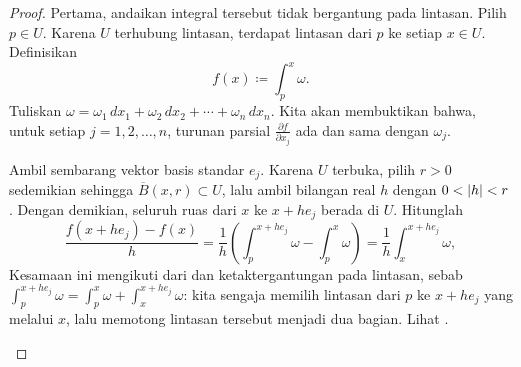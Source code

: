 \begin{proof}
Pertama, andaikan integral tersebut tidak bergantung pada lintasan. Pilih
$p \in U$. Karena $U$ terhubung lintasan, terdapat lintasan dari $p$ ke setiap
$x \in U$. Definisikan
\begin{equation*}
f(x) \coloneqq \int_{p}^x \omega .
\end{equation*}
Tuliskan $\omega = \omega_1 \,dx_1 + \omega_2 \,dx_2 + \cdots + \omega_n \,dx_n$.
Kita akan membuktikan bahwa, untuk setiap $j = 1,2,\ldots,n$, turunan parsial
$\frac{\partial f}{\partial x_j}$ ada dan sama dengan $\omega_j$.

Ambil sembarang vektor basis standar $e_j$. Karena $U$ terbuka, pilih $r>0$
sedemikian sehingga $\overline{B}(x,r)\subset U$, lalu ambil bilangan real $h$
dengan $0<\lvert {h} \rvert<r$. Dengan demikian, seluruh ruas dari $x$ ke $x+he_j$
berada di $U$. Hitunglah
\begin{equation*}
\frac{f(x+h e_j) - f(x)}{h} =
\frac{1}{h} \left( \int_{p}^{x+he_j} \omega - \int_{p}^x \omega \right)
=
\frac{1}{h} \int_{x}^{x+he_j} \omega ,
\end{equation*}
Kesamaan ini mengikuti dari  dan ketaktergantungan
pada lintasan, sebab
$\int_{p}^{x+he_j} \omega =
\int_{p}^{x} \omega +
\int_{x}^{x+he_j} \omega$: kita sengaja memilih lintasan dari $p$ ke
$x+he_j$ yang melalui $x$, lalu memotong lintasan tersebut menjadi dua bagian.
Lihat .

\begin{myfigureht}
\caption{Menggunakan ketaktergantungan pada lintasan untuk menghitung turunan
parsial.\label{fig:pathindantider}}
\end{myfigureht}



\end{proof}
